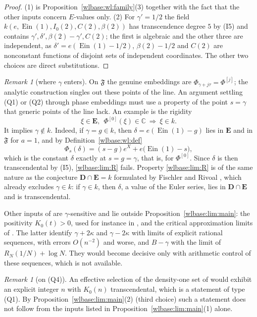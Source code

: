 \documentclass[11pt,a4paper]{article}
\theoremstyle{definition}\newtheorem{definition}[theorem]{Definition}
\theoremstyle{remark}\newtheorem{remark}[theorem]{Remark}
\newcommand{\E}{\mathbf E}\newcommand{\Ebar}{\overline{\mathbf E}}
\newcommand{\Ein}{\operatorname{Ein}}
\newcommand{\F}{\mathfrak F}\newcommand{\FF}{\mathbb F}
\newcommand{\C}{\mathbb C}\newcommand{\Z}{\mathbb Z}
\begin{document}
\begin{proof}
(1) is Proposition~\ref{wlbase:wl:family}(3) together with the fact that the other
inputs concern $E$-values only. (2) For $\gamma'=1/2$ the field
$k(e,\Ein(1),I_0(2),C(2),\beta(2))$ has transcendence degree $5$ by (I5) and
contains $\gamma',\delta',\beta(2)-\gamma',C(2)$; the first is algebraic and
the other three are independent, as $\delta'=e(\Ein(1)-1/2)$,
$\beta(2)-1/2$ and $C(2)$ are nonconstant functions of disjoint sets of
independent coordinates. The other two choices are direct substitutions.
\end{proof}

\begin{remark}[where $\gamma$ enters]\label{wlbase:lim:point}
On $\F$ the genuine embeddings are $\Phi_{\gamma+j\tau}=\Phi^{[j]}$; the
analytic construction singles out these points of the line. An argument
settling (Q1) or (Q2) through phase embeddings must use a property of the
point $s=\gamma$ that generic points of the line lack. An example is the
rigidity
\begin{equation}\label{wlbase:lim:R}
 \xi\in\E,\ \ \Phi^{[0]}(\xi)\in\C\ \Longrightarrow\ \xi\in k .
\end{equation}
It implies $\gamma\notin k$. Indeed, if $\gamma=g\in k$, then
$\delta=e(\Ein(1)-g)$ lies in $\E$ and in $\F$ for $a=1$, and by
Definition~\ref{wlbase:wl:def}
\[
 \Phi_s(\delta)=(s-g)e^X+e\bigl(\Ein(1)-s\bigr),
\]
which is the constant $\delta$ exactly at $s=g=\gamma$, that is, for
$\Phi^{[0]}$. Since $\delta$ is then transcendental by (I5), \eqref{wlbase:lim:R}
fails. Property \eqref{wlbase:lim:R} is of the same nature as the conjecture
$\mathbf D\cap\E=k$ formulated by Fischler and Rivoal \cite{FRG}, which
already excludes $\gamma\in k$: if $\gamma\in k$, then $\delta$, a value of
the Euler series, lies in $\mathbf D\cap\E$ and is transcendental.

Other inputs of \cite{EB} are $\gamma$-sensitive and lie outside
Proposition~\ref{wlbase:lim:main}: the positivity $K_0(t)>0$, used for instance in
\cite[Theorem~jden:rank]{EB}, and the critical approximation limits of
\cite[\S limits]{EB}. The latter identify $\gamma+2\kappa$ and $\gamma-2\kappa$
with limits of explicit rational sequences, with errors $O(n^{-2})$ and worse,
and $B-\gamma$ with the limit of $R_N(1/N)+\log N$. They would become decisive
only with arithmetic control of these sequences, which is not available.
\end{remark}

\begin{remark}[on (Q4)]
An effective selection of the density-one set of
\cite[Theorem~jden:density]{EB} would exhibit an explicit integer $n$ with
$K_0(n)$ transcendental, which is a statement of type (Q1). By
Proposition~\ref{wlbase:lim:main}(2) (third choice) such a statement does not follow
from the inputs listed in Proposition~\ref{wlbase:lim:main}(1) alone.
\end{remark}
\end{document}
